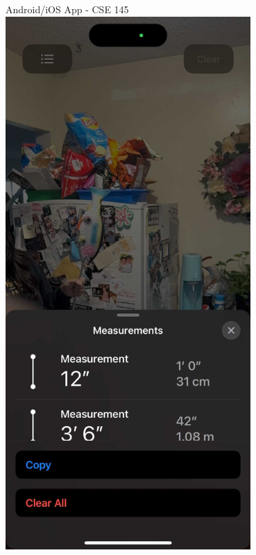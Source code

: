 \begin{frame}{Android/iOS App - CSE 145}
    \centering
    \includegraphics[height=0.7\textheight,width=0.7\textwidth,keepaspectratio]{fishsense_ios_measure.jpg}
\end{frame}
